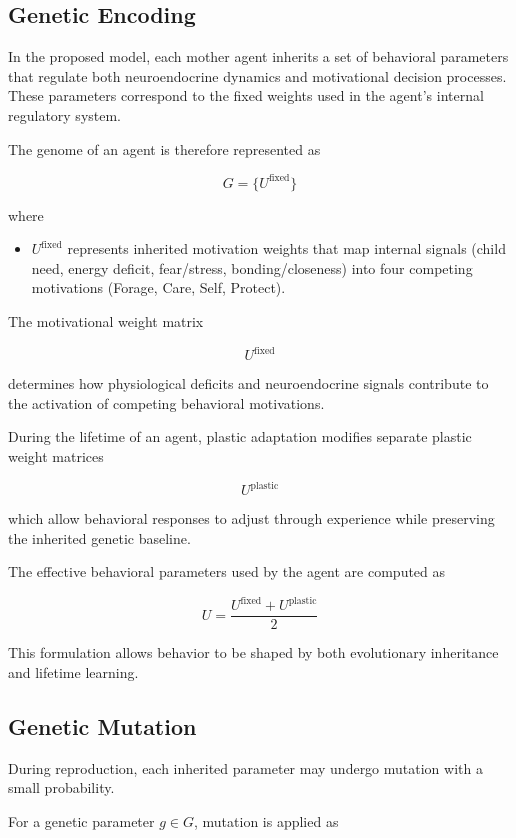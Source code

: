 \subsection{Genetic Encoding}

In the proposed model, each mother agent inherits a set of behavioral
parameters that regulate both neuroendocrine dynamics and motivational
decision processes. These parameters correspond to the fixed weights
used in the agent’s internal regulatory system.

The genome of an agent is therefore represented as

\[
G =
\{U^{\text{fixed}}\}
\]

where

\begin{itemize}
\item $U^{\text{fixed}}$ represents inherited motivation weights that map internal signals (child need, energy deficit, fear/stress, bonding/closeness) into four competing motivations (Forage, Care, Self, Protect).
\end{itemize}

The motivational weight matrix

\[
U^{\text{fixed}}
\]

determines how physiological deficits and neuroendocrine signals
contribute to the activation of competing behavioral motivations.

During the lifetime of an agent, plastic adaptation modifies separate
plastic weight matrices

\[
U^{\text{plastic}}
\]

which allow behavioral responses to adjust through experience while
preserving the inherited genetic baseline.

The effective behavioral parameters used by the agent are computed as

\[
U = \frac{U^{\text{fixed}} + U^{\text{plastic}}}{2}
\]

This formulation allows behavior to be shaped by both evolutionary
inheritance and lifetime learning.


\subsection{Genetic Mutation}

During reproduction, each inherited parameter may undergo mutation
with a small probability.

For a genetic parameter $g \in G$, mutation is applied as

